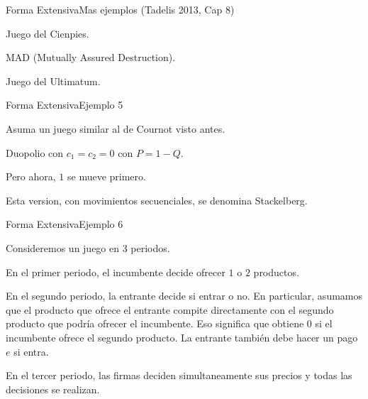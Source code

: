 \documentclass[notes, 11pt]{beamer} %
\newenvironment{wideitemize}{\itemize\addtolength{\itemsep}{10pt}}{\enditemize}
\begin{document}
\begin{frame}{Forma Extensiva}{Mas ejemplos (Tadelis 2013, Cap 8)}
	\begin{wideitemize}
		\item<1-> Juego del Cienpies.
		\item<2-> MAD (Mutually Assured Destruction).
		\item<3-> Juego del Ultimatum.
	\end{wideitemize}
\end{frame}


\iffalse
\begin{frame}{Forma Extensiva}{Ejemplo 5}
	\begin{wideitemize}
		\item<1-> Asuma un juego similar al de Cournot visto antes.
		\item<2-> Duopolio con $c_{1} = c_{2} = 0$ con $P = 1 - Q$.
		\item<3-> Pero ahora, $1$ se mueve primero.
		\item<4-> Esta version, con movimientos secuenciales, se denomina Stackelberg.
	\end{wideitemize}
\end{frame}


\begin{frame}{Forma Extensiva}{Ejemplo 6}
	\begin{wideitemize}
		\item<1-> Consideremos un juego en $3$ periodos.
		\begin{wideitemize}
			\item<2->[--] En el primer periodo, el incumbente decide ofrecer $1$ o $2$ productos.
			\item<3->[--] En el segundo periodo, la entrante decide si entrar o no. En particular, asumamos que el producto que ofrece el entrante compite directamente con el segundo producto que podr\'ia ofrecer el incumbente. Eso significa que obtiene $0$ si el incumbente ofrece el segundo producto. La entrante tambi\'en debe hacer un pago $e$ si entra.
			\item<4->[--] En el tercer periodo, las firmas deciden simultaneamente sus precios y todas las decisiones se realizan.
		\end{wideitemize}
	\end{wideitemize}
\end{frame}
\end{document}
